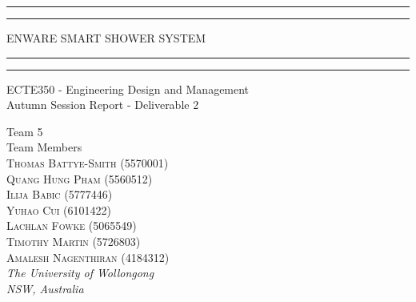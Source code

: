 \documentclass[12pt, a4paper]{article}
\begin{document}
 
    \begin{titlepage} %
        \centering %
        \scshape %
        \vspace*{\baselineskip} %
        
        \rule{\textwidth}{1.6pt}\vspace*{-\baselineskip}\vspace*{2pt} %
        \rule{\textwidth}{0.4pt} %
        
        \vspace{0.75\baselineskip} %
        {\LARGE ENWARE SMART SHOWER SYSTEM\\} %
        \vspace{0.75\baselineskip} %
        \rule{\textwidth}{0.4pt}\vspace*{-\baselineskip}\vspace{3.2pt} %
        \rule{\textwidth}{1.6pt} %
        \vspace{2\baselineskip} %
        
        ECTE350 - Engineering Design and Management \\
            Autumn Session Report - Deliverable 2 %
        \vspace*{3\baselineskip} %
        
        Team 5\\
        Team Members\\
        \vspace{0.5\baselineskip} %
        {\scshape
            Thomas Battye-Smith (5570001)\\
            Quang Hung Pham (5560512)\\
            Ilija Babic (5777446)\\
            Yuhao Cui (6101422)\\
            Lachlan Fowke (5065549)\\
            Timothy Martin (5726803)\\
            Amalesh Nagenthiran (4184312)\\} %
        \vspace{0.5\baselineskip} %
        \textit{The University of Wollongong \\ NSW, Australia} %
        \vfill %
        

\end{titlepage}
\end{document}
